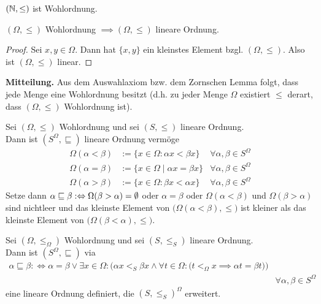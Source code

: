 \begin{beispiel}
$(\mathbb{N},\leq)$ ist Wohlordnung.
\end{beispiel}

\begin{bemerkung}
$(\Omega,\leq)$ Wohlordnung $\implies(\Omega,\leq)$ lineare Ordnung.
\end{bemerkung}
\begin{proof}
Sei $x,y\in\Omega$. Dann hat $\lbrace x,y\rbrace$ ein kleinstes Element bzgl. $(\Omega,\leq)$. Also ist $(\Omega,\leq)$ linear.
\end{proof}

\textbf{Mitteilung.} Aus dem Auswahlaxiom bzw. dem Zornschen Lemma folgt, dass jede Menge eine Wohlordnung besitzt (d.h. zu jeder Menge $\Omega$ existiert $\leq$ derart, dass $(\Omega,\leq)$ Wohlordnung ist).

\begin{satz}
Sei $(\Omega,\leq)$ Wohlordnung und sei $(S,\leq)$ lineare Ordnung.\\
Dann ist $(S^\Omega,\sqsubseteq)$ lineare Ordnung vermöge
\begin{align*}
\Omega(\alpha<\beta)&:=\lbrace x\in\Omega:\alpha x<\beta x\rbrace &\forall \alpha,\beta\in S^\Omega\\
\Omega(\alpha=\beta)&:=\lbrace x\in\Omega\mid\alpha x=\beta x\rbrace &\forall \alpha,\beta\in S^\Omega\\
\Omega(\alpha>\beta)&:=\lbrace x\in\Omega:\beta x<\alpha x\rbrace &\forall\alpha,\beta\in S^\Omega
\end{align*}
Setze dann
$\alpha\sqsubseteq\beta:\Leftrightarrow\Omega(\beta>\alpha)=\emptyset$ oder $\alpha=\beta$ oder $\Omega(\alpha<\beta)$ und $\Omega(\beta>\alpha)$ sind nichtleer und das kleinste Element von $\big(\Omega(\alpha<\beta),\leq\big)$ ist kleiner als das kleinste Element von $\big(\Omega(\beta<\alpha),\leq\big)$.
\end{satz}


\begin{satz}
Sei $(\Omega,\leq_\Omega)$ Wohlordnung und sei $(S,\leq_S)$ lineare Ordnung.\\
Dann ist $(S^\Omega,\sqsubseteq)$ via
\begin{align*}
\alpha\sqsubseteq\beta:\Longleftrightarrow\alpha=\beta\vee\exists x\in\Omega:\Big(\alpha x<_S\beta x\wedge\forall t\in\Omega:\big(t<_\Omega x\implies \alpha t=\beta t\big)\Big)
\\&\forall\alpha,\beta\in S^\Omega
\end{align*}
eine lineare Ordnung definiert, die $(S,\leq_S)^\Omega$ erweitert.
\end{satz}

